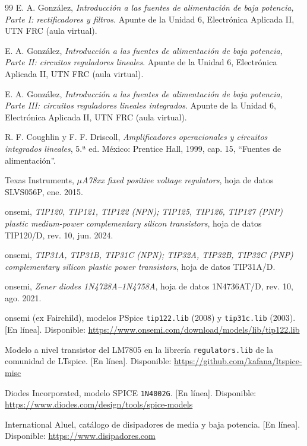 \documentclass{plantilla}
\begin{document}
\begin{thebibliography}{99}
E. A. González, \emph{Introducción a las fuentes de alimentación de baja potencia, Parte I: rectificadores y filtros}. Apunte de la Unidad 6, Electrónica Aplicada II, UTN FRC (aula virtual).

E. A. González, \emph{Introducción a las fuentes de alimentación de baja potencia, Parte II: circuitos reguladores lineales}. Apunte de la Unidad 6, Electrónica Aplicada II, UTN FRC (aula virtual).

E. A. González, \emph{Introducción a las fuentes de alimentación de baja potencia, Parte III: circuitos reguladores lineales integrados}. Apunte de la Unidad 6, Electrónica Aplicada II, UTN FRC (aula virtual).

R. F. Coughlin y F. F. Driscoll, \emph{Amplificadores operacionales y circuitos integrados lineales}, 5.ª ed. México: Prentice Hall, 1999, cap. 15, ``Fuentes de alimentación''.

Texas Instruments, \emph{$\mu$A78xx fixed positive voltage regulators}, hoja de datos SLVS056P, ene. 2015.

onsemi, \emph{TIP120, TIP121, TIP122 (NPN); TIP125, TIP126, TIP127 (PNP) plastic medium-power complementary silicon transistors}, hoja de datos TIP120/D, rev. 10, jun. 2024.

onsemi, \emph{TIP31A, TIP31B, TIP31C (NPN); TIP32A, TIP32B, TIP32C (PNP) complementary silicon plastic power transistors}, hoja de datos TIP31A/D.

onsemi, \emph{Zener diodes 1N4728A--1N4758A}, hoja de datos 1N4736AT/D, rev. 10, ago. 2021.

onsemi (ex Fairchild), modelos PSpice \texttt{tip122.lib} (2008) y \texttt{tip31c.lib} (2003). [En línea]. Disponible: \url{https://www.onsemi.com/download/models/lib/tip122.lib}

Modelo a nivel transistor del LM7805 en la librería \texttt{regulators.lib} de la comunidad de LTspice. [En línea]. Disponible: \url{https://github.com/kafana/ltspice-misc}

Diodes Incorporated, modelo SPICE \texttt{1N4002G}. [En línea]. Disponible: \url{https://www.diodes.com/design/tools/spice-models}

International Aluel, catálogo de disipadores de media y baja potencia. [En línea]. Disponible: \url{https://www.disipadores.com}
\end{thebibliography}
\end{document}
